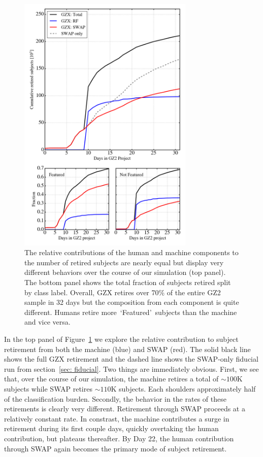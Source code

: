 \documentclass[twocolumn]{aastex6}
\newcommand{\feat}{`Featured'}
\begin{document}
\begin{figure}[t!]
\includegraphics[width=3.3in]{figures/GZ2_sup_PLPD5_p5_flipfeature2b_RF_accuracy_redo_raw_combo_GZX_component_contributions.png}
\caption{The relative contributions of the human and machine components to the number of retired subjects are nearly equal but display very different behaviors over the course of our simulation (top panel). The bottom panel shows the total fraction of subjects retired split by class label. Overall, GZX retires over 70\% of the entire GZ2 sample in 32 days but the composition from each component is quite different. Humans retire more~\feat~subjects than the machine and vice versa. \label{fig: gzx components}}
\end{figure}

In the top panel of Figure~\ref{fig: gzx components} we explore the relative 
contribution to subject retirement from both the machine (blue) and SWAP (red). 
The solid black line shows the full GZX retirement 
and the dashed line shows the SWAP-only fiducial run from section~\ref{sec: fiducial}. 
Two things are immediately obvious. 
First, we see that, over the course of our simulation, the machine retires a total of 
$\sim100$K subjects while SWAP retires $\sim110$K subjects. Each shoulders approximately
half of the classification burden. Secondly, the behavior in the rates of these
retirements is clearly very different. Retirement through SWAP proceeds at a relatively
constant rate. In constrast, the machine contributes a surge in retirement during 
its first couple days, quickly overtaking the human contribution, but plateaus thereafter.
By Day 22, the human contribution through SWAP again becomes the primary mode 
of subject retirement. 
\end{document}
